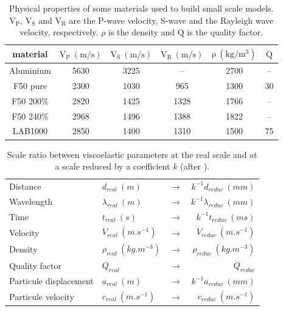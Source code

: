 \documentclass[manuscript,revised]{geophysics}
\begin{document}
\begin{table}[!ht]
	\centering
	\begin{tabular}{cccccc}
		\hline
		material & $\mathrm{V_{P}\ (m/s)}$ & $\mathrm{V_{S}\ (m/s)}$ & $\mathrm{V_{R}\ (m/s)}$ & $\mathrm{\rho\ (kg/m^{3})}$ & $\mathrm{Q}$ \\
		\hline
		Aluminium & 5630 & 3225 & --   & 2700 & --  \\
		F50 pure  & 2300 & 1030 & 965  & 1300 & 30  \\
		F50 200\% & 2820 & 1425 & 1328 & 1766 & --  \\
		F50 240\% & 2968 & 1496 & 1388 & 1822 & --  \\
		LAB1000   & 2850 & 1400 & 1310 & 1500 & 75  \\
		\hline
	\end{tabular}
	\caption{Physical properties of some materials used to build small scale models. $\mathrm{V_{P}}$, $\mathrm{V_{S}}$ and $\mathrm{V_{R}}$ are the P-wave velocity, S-wave and the Rayleigh wave velocity, respectively. $\rho$ is the density and $\mathrm{Q}$ is the quality factor.}
	\label{epoxy-resin}
\end{table}

\begin{table}[!ht]
	\centering
	\begin{tabular}{|l|lcr|}
		
		\hline
		Distance               & $d_{real}\ (m)$            & $\rightarrow$ & $k^{-1}d_{reduc}\ (mm)$ \\
		Wavelength             & $\lambda_{real}\ (m)$      & $\rightarrow$ & $k^{-1}\lambda_{reduc}\ (mm)$ \\
		Time                   & $t_{real}\ (s)$            & $\rightarrow$ & $k^{-1}t_{reduc}\ (ms)$ \\
		Velocity               & $V_{real}\ (m.s^{-1})$     & $\rightarrow$ & $V_{reduc}\ (m.s^{-1})$ \\
		Density                & $\rho_{real}\ (kg.m^{-3})$ & $\rightarrow$ & $\rho_{reduc}\ (kg.m^{-3})$ \\
		Quality factor         & $Q_{real}$                 & $\rightarrow$ & $Q_{reduc}$ \\
		Particule displacement & $a_{real}\ (m)$            & $\rightarrow$ & $k^{-1}a_{reduc}\ (mm)$ \\
		Particule velocity     & $c_{real}\ (m.s^{-1})$     & $\rightarrow$ & $c_{reduc}\ (m.s^{-1})$ \\
		\hline
	\end{tabular}
	\caption{Scale ratio between viscoelastic parameters at the real scale and at a scale reduced by a coefficient $k$ (after \citet{Bretaudeau_SSM_2011}).}
	\label{scale-ratio}
\end{table}
\end{document}
